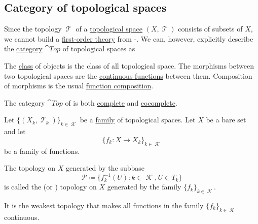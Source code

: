 \subsection{Category of topological spaces}\label{subsec:category_of_topological_spaces}

\begin{definition}\label{def:category_of_small_topological_spaces}
  Since the topology \( \mscrT \) of a \hyperref[def:topological_space]{topological space} \( (X, \mscrT) \) consists of subsets of \( X \), we cannot build a \hyperref[def:first_order_theory]{first-order theory} from -. We can, however, explicitly describe the \hyperref[def:category]{category} \( \cat{Top} \) of topological spaces as
  \begin{refenum}
     The \hyperref[def:set]{class} of objects is the class of all topological space.
     The morphisms between two topological spaces are the \hyperref[def:global_continuity]{continuous functions} between them.
     Composition of morphisms is the usual \hyperref[def:set_valued_map/composition]{function composition}.
  \end{refenum}
\end{definition}

\begin{theorem}\label{thm:top_complete_cocomplete}
  The category \( \cat{Top} \) of is both \hyperref[def:category_of_cones/limit]{complete} and \hyperref[def:category_of_cones/colimit]{cocomplete}.
\end{theorem}

\begin{definition}\label{def:initial_topology}
  Let \( \{ (X_k, \mscrT_k) \}_{k \in \mscrK} \) be a \hyperref[def:cartesian_product/indexed_family]{family} of topological spaces. Let \( X \) be a bare set and let
  \begin{equation*}
    \{ f_k: X \to X_k \}_{k \in \mscrK}
  \end{equation*}
  be a family of functions.

  The topology on \( X \) generated by the subbase
  \begin{equation*}
    \mathcal{P} \coloneqq \{ f_k^{-1}(U) \colon k \in \mscrK, U \in T_k \}
  \end{equation*}
  is called the  (or ) topology on \( X \) generated by the family \( \{ f_k \}_{k \in \mscrK} \).

  It is the weakest topology that makes all functions in the family \( \{ f_k \}_{k \in \mscrK} \) continuous.
\end{definition}

